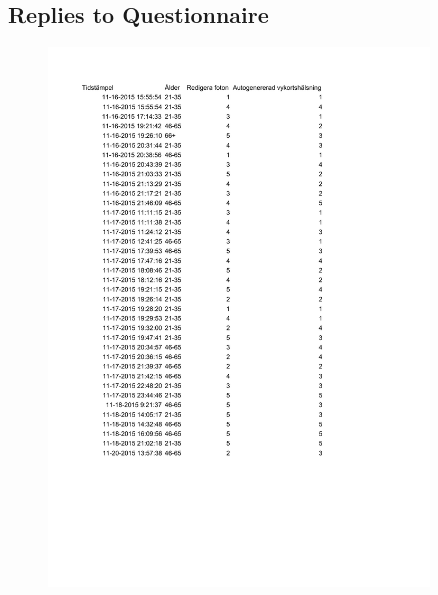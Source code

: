\documentclass[10pt,a4paper]{article}
\begin{document}
\begin{appendices}
\section{Replies to Questionnaire}
\begin{figure}[h!]
\centering
\includegraphics[width=0.9\textwidth]{PostCardBuddyQuest.pdf}
\end{figure}


\end{appendices}
\end{document}

